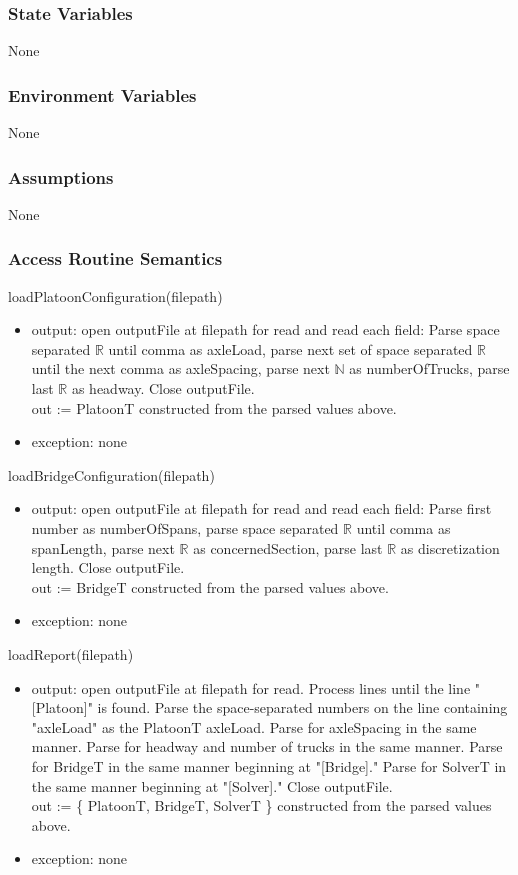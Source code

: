 \documentclass[12pt, titlepage]{article}
\begin{document}
\subsubsection{State Variables}
None
\subsubsection{Environment Variables}
None
\subsubsection{Assumptions}
None
\subsubsection{Access Routine Semantics}

\noindent loadPlatoonConfiguration(filepath)
\begin{itemize}
\item output: open outputFile at filepath for read and read each field: 
Parse space separated $\mathbb{R}$ until comma as axleLoad, parse next set of space separated $\mathbb{R}$ until the next comma as axleSpacing, parse next $\mathbb{N}$ as numberOfTrucks, parse last $\mathbb{R}$ as headway.
Close outputFile.\\
out := PlatoonT constructed from the parsed values above.
\item exception: none
\end{itemize}

\noindent loadBridgeConfiguration(filepath)
\begin{itemize}
\item output: open outputFile at filepath for read and read each field: 
Parse first number as numberOfSpans, parse space separated $\mathbb{R}$ until comma as spanLength, parse next $\mathbb{R}$ as concernedSection, parse last $\mathbb{R}$ as discretization length.
Close outputFile.\\
out := BridgeT constructed from the parsed values above.
\item exception: none
\end{itemize}

\noindent loadReport(filepath)
\begin{itemize}
\item output: open outputFile at filepath for read. Process lines until the line "[Platoon]" is found. Parse the space-separated numbers on the line containing "axleLoad" as the PlatoonT axleLoad. Parse for axleSpacing in the same manner. Parse for headway and number of trucks in the same manner. Parse for BridgeT in the same manner beginning at "[Bridge]." Parse for SolverT in the same manner beginning at "[Solver]." Close outputFile.\\
out := \{ PlatoonT, BridgeT, SolverT \} constructed from the parsed values above.
\item exception: none
\end{itemize}
\end{document}
